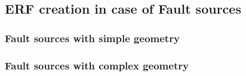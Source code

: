 %
\subsection{ERF creation in case of Fault sources}

%
\subsubsection{Fault sources with simple geometry}

%
\subsubsection{Fault sources with complex geometry}
